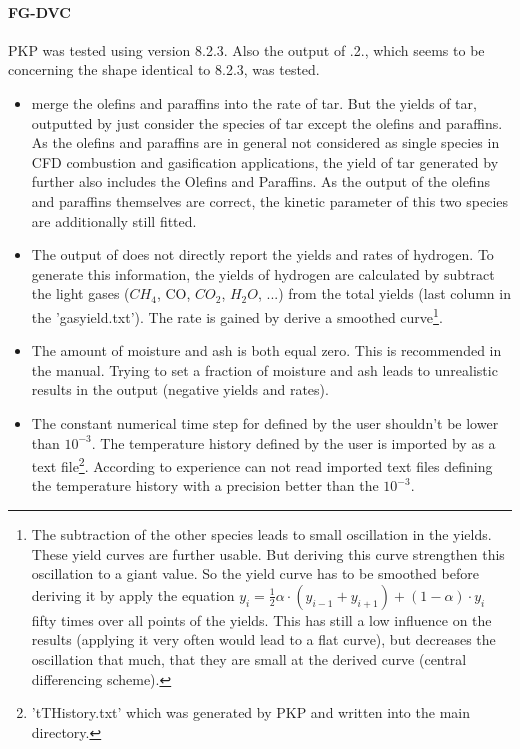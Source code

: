 \paragraph{FG-DVC}
PKP was tested using \FGDVC version 8.2.3. Also the output of .2., which seems to be concerning the shape identical to 8.2.3, was tested.
\begin{itemize}
 \item \FGDVC merge the olefins and paraffins into the rate of tar. But the yields of tar, outputted by \FGDVC just consider the species of tar except the olefins and paraffins. As the olefins and paraffins are in general not considered as single species in CFD combustion and gasification applications, the yield of tar generated by \FGDVC further also includes the Olefins and Paraffins. As the output of the olefins and paraffins themselves are correct, the kinetic parameter of this two species are additionally still fitted.
 \item The output of \FGDVC does not directly report the yields and rates of hydrogen. To generate this information, the yields of hydrogen are calculated by subtract the light gases ($CH_4$, CO, $CO_2$, $H_2O$, ...) from the total yields (last column in the 'gasyield.txt'). The rate is gained by derive a smoothed curve\footnote{The subtraction of the other species leads to small oscillation in the yields. These yield curves are further usable. But deriving this curve strengthen this oscillation to a giant value. So the yield curve has to be smoothed before deriving it by apply the equation $y_i=\frac{1}{2} \alpha \cdot (y_{i-1}+y_{i+1})+(1-\alpha) \cdot y_i$ fifty times over all points of the yields. This has still a low influence on the results (applying it very often would lead to a flat curve), but decreases the oscillation that much, that they are small at the derived curve (central differencing scheme).}.
 \item The amount of moisture and ash is both equal zero. This is recommended in the manual. Trying to set a fraction of moisture and ash leads to unrealistic results in the \FGDVC output (negative yields and rates).
 \item The constant numerical time step for \FGDVC defined by the user shouldn't be lower than $10^{-3}$. The temperature history defined by the user is imported by \FGDVC as a text file\footnote{'tTHistory.txt' which was generated by PKP and written into the \FGDVC main directory.}. According to experience can \FGDVC not read imported text files defining the temperature history with a precision better than the $10^{-3}$.
\end{itemize}

